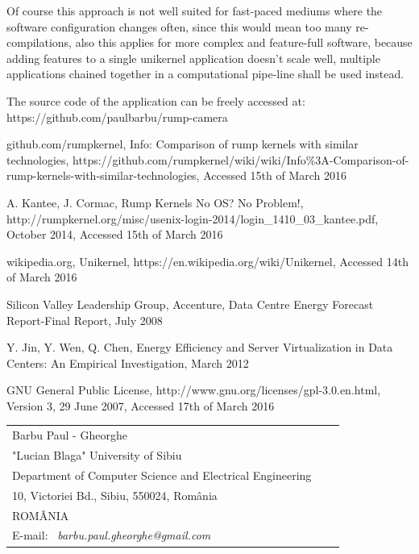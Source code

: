 \documentclass[10pt,a4paper,twoside]{article}
\begin{document}
 Of course this approach is not well suited for fast-paced mediums where the software configuration changes often,
 since this would mean too many re-compilations, also this applies for more complex and feature-full software,
 because adding features to a single unikernel application doesn't scale well,
 multiple applications chained together in a computational pipe-line shall be used instead.

 The source code of the application can be freely accessed at: https://github.com/paulbarbu/rump-camera

\begin{thebibliography}{*}\label{Refences}
github.com/rumpkernel, \newblock Info: Comparison of rump kernels with similar technologies,
\newblock https://github.com/rumpkernel/wiki/wiki/Info\%3A-Comparison-of-rump-kernels-with-similar-technologies,
\newblock Accessed 15th of March 2016

\vspace{-7pt}
A. Kantee, J. Cormac, \newblock Rump Kernels No OS? No Problem!,
\newblock http://rumpkernel.org/misc/usenix-login-2014/login\_1410\_03\_kantee.pdf,
\newblock October 2014,
\newblock Accessed 15th of March 2016

\vspace{-7pt}
wikipedia.org, \newblock Unikernel,
\newblock https://en.wikipedia.org/wiki/Unikernel,
\newblock Accessed 14th of March 2016

\vspace{-7pt}
Silicon Valley Leadership Group, Accenture, \newblock
Data Centre Energy Forecast Report-Final Report, \newblock July 2008

\vspace{-7pt}
Y. Jin, Y. Wen, Q. Chen,
\newblock Energy Efficiency and Server Virtualization in Data Centers: An Empirical Investigation,
\newblock March 2012

GNU General Public License, \newblock http://www.gnu.org/licenses/gpl-3.0.en.html,
\newblock Version 3, 29 June 2007,
\newblock Accessed 17th of March 2016

\end{thebibliography}

\vspace*{1cm} {\footnotesize
\begin{tabular*}{16cm}{p{4.2cm}p{4.2cm}p{4.2cm}}
Barbu Paul - Gheorghe & \\
"Lucian Blaga" University of Sibiu & \\
Department of Computer Science and Electrical Engineering & \\
10, Victoriei Bd., Sibiu, 550024, Rom\^ania & \\
ROM\^ANIA & \\
E-mail: \ {\it barbu.paul.gheorghe@gmail.com}&
\end{tabular*}}
\end{document}
